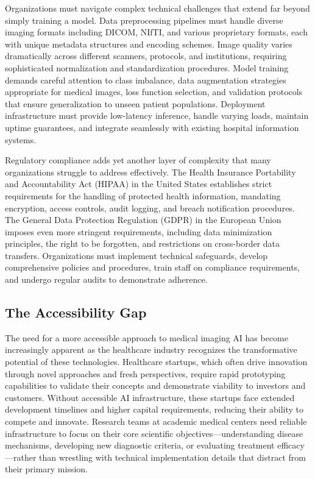 \documentclass[12pt,a4paper]{article}
\begin{document}
Organizations must navigate complex technical challenges that extend far beyond simply training a model. Data preprocessing pipelines must handle diverse imaging formats including DICOM, NIfTI, and various proprietary formats, each with unique metadata structures and encoding schemes. Image quality varies dramatically across different scanners, protocols, and institutions, requiring sophisticated normalization and standardization procedures. Model training demands careful attention to class imbalance, data augmentation strategies appropriate for medical images, loss function selection, and validation protocols that ensure generalization to unseen patient populations. Deployment infrastructure must provide low-latency inference, handle varying loads, maintain uptime guarantees, and integrate seamlessly with existing hospital information systems.

Regulatory compliance adds yet another layer of complexity that many organizations struggle to address effectively. The Health Insurance Portability and Accountability Act (HIPAA) in the United States establishes strict requirements for the handling of protected health information, mandating encryption, access controls, audit logging, and breach notification procedures. The General Data Protection Regulation (GDPR) in the European Union imposes even more stringent requirements, including data minimization principles, the right to be forgotten, and restrictions on cross-border data transfers. Organizations must implement technical safeguards, develop comprehensive policies and procedures, train staff on compliance requirements, and undergo regular audits to demonstrate adherence.

\subsection{The Accessibility Gap}

The need for a more accessible approach to medical imaging AI has become increasingly apparent as the healthcare industry recognizes the transformative potential of these technologies. Healthcare startups, which often drive innovation through novel approaches and fresh perspectives, require rapid prototyping capabilities to validate their concepts and demonstrate viability to investors and customers. Without accessible AI infrastructure, these startups face extended development timelines and higher capital requirements, reducing their ability to compete and innovate. Research teams at academic medical centers need reliable infrastructure to focus on their core scientific objectives—understanding disease mechanisms, developing new diagnostic criteria, or evaluating treatment efficacy—rather than wrestling with technical implementation details that distract from their primary mission.
\end{document}
